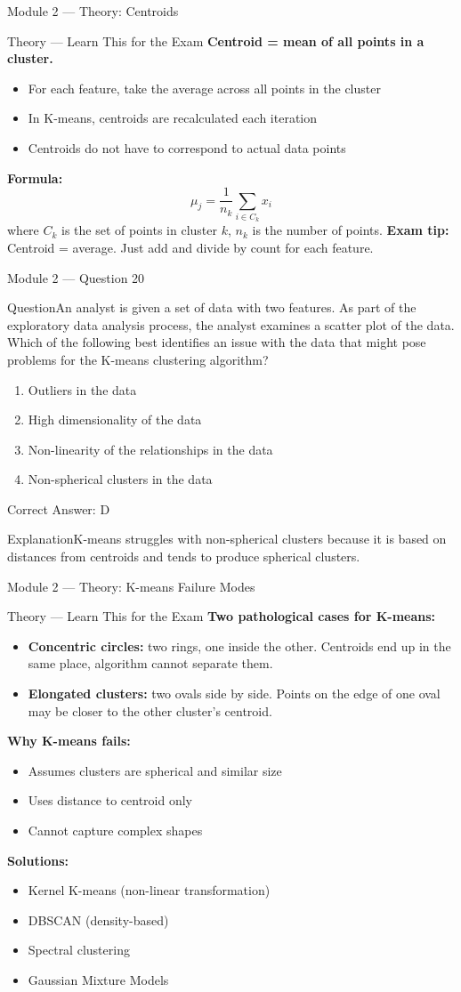 \documentclass[aspectratio=169,10pt]{beamer}
\newcommand{\question}[1]{\begin{block}{Question}#1\end{block}}
\newcommand{\options}[4]{%
	\begin{enumerate}[label=\Alph*.,leftmargin=*]
		\item #1
		\item #2
		\item #3
		\item #4
	\end{enumerate}
}
\newcommand{\answerbox}[1]{\begin{exampleblock}{Correct Answer: #1}\end{exampleblock}}
\newcommand{\explain}[1]{\begin{block}{Explanation}#1\end{block}}
\newcommand{\theory}[1]{%
	\begin{block}{Theory --- Learn This for the Exam}
		\small #1
	\end{block}
}
\begin{document}
	\begin{frame}{Module 2 --- Theory: Centroids}
		\theory{
			\textbf{Centroid = mean of all points in a cluster.}
			\begin{itemize}
				\item For each feature, take the average across all points in the cluster
				\item In K-means, centroids are recalculated each iteration
				\item Centroids do not have to correspond to actual data points
			\end{itemize}
			\textbf{Formula:}
			\[
			\mu_j = \frac{1}{n_k} \sum_{i \in C_k} x_i
			\]
			where $C_k$ is the set of points in cluster $k$, $n_k$ is the number of points.
			\textbf{Exam tip:} Centroid = average. Just add and divide by count for each feature.
		}
	\end{frame}
	
	\begin{frame}{Module 2 --- Question 20}
		\question{An analyst is given a set of data with two features. As part of the exploratory data analysis process, the analyst examines a scatter plot of the data. Which of the following best identifies an issue with the data that might pose problems for the K-means clustering algorithm?}
		\options{Outliers in the data}{High dimensionality of the data}{Non-linearity of the relationships in the data}{Non-spherical clusters in the data}
		\answerbox{D}
		\explain{K-means struggles with non-spherical clusters because it is based on distances from centroids and tends to produce spherical clusters.}
	\end{frame}
	
	\begin{frame}{Module 2 --- Theory: K-means Failure Modes}
		\theory{
			\textbf{Two pathological cases for K-means:}
			\begin{itemize}
				\item \textbf{Concentric circles:} two rings, one inside the other. Centroids end up in the same place, algorithm cannot separate them.
				\item \textbf{Elongated clusters:} two ovals side by side. Points on the edge of one oval may be closer to the other cluster's centroid.
			\end{itemize}
			\textbf{Why K-means fails:}
			\begin{itemize}
				\item Assumes clusters are spherical and similar size
				\item Uses distance to centroid only
				\item Cannot capture complex shapes
			\end{itemize}
			\textbf{Solutions:}
			\begin{itemize}
				\item Kernel K-means (non-linear transformation)
				\item DBSCAN (density-based)
				\item Spectral clustering
				\item Gaussian Mixture Models
			\end{itemize}
		}
	\end{frame}
	
\end{document}
